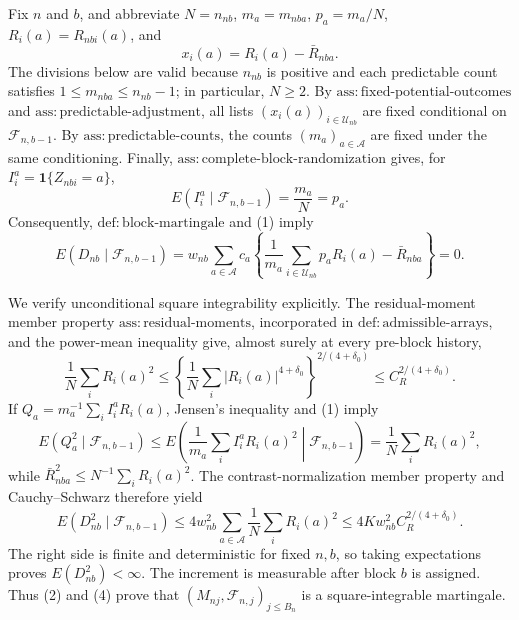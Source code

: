 Fix \(n\) and \(b\), and abbreviate \(N=n_{nb}\), \(m_a=m_{nba}\), \(p_a=m_a/N\), \(R_i(a)=R_{nbi}(a)\), and
\[
x_i(a)=R_i(a)-\bar R_{nba}.
\]
The divisions below are valid because \(n_{nb}\) is positive and each predictable count satisfies \(1\le m_{nba}\le n_{nb}-1\); in particular, \(N\ge2\). By \(\mathrm{ass:fixed\text{-}potential\text{-}outcomes}\) and \(\mathrm{ass:predictable\text{-}adjustment}\), all lists \((x_i(a))_{i\in\mathcal U_{nb}}\) are fixed conditional on \(\mathcal F_{n,b-1}\). By \(\mathrm{ass:predictable\text{-}counts}\), the counts \((m_a)_{a\in\mathcal A}\) are fixed under the same conditioning. Finally, \(\mathrm{ass:complete\text{-}block\text{-}randomization}\) gives, for \(I_i^a=\mathbf 1\{Z_{nbi}=a\}\),
\[
E(I_i^a\mid\mathcal F_{n,b-1})=\frac{m_a}{N}=p_a.
\tag{1}
\]
Consequently, \(\mathrm{def:block\text{-}martingale}\) and (1) imply
\[
E(D_{nb}\mid\mathcal F_{n,b-1})
=w_{nb}\sum_{a\in\mathcal A}c_a
\left\{\frac1{m_a}\sum_{i\in\mathcal U_{nb}}p_aR_i(a)-\bar R_{nba}\right\}=0.
\tag{2}
\]

We verify unconditional square integrability explicitly. The residual-moment member property \(\mathrm{ass:residual\text{-}moments}\), incorporated in \(\mathrm{def:admissible\text{-}arrays}\), and the power-mean inequality give, almost surely at every pre-block history,
\[
\frac1N\sum_iR_i(a)^2
\le \left\{\frac1N\sum_i|R_i(a)|^{4+\delta_0}\right\}^{2/(4+\delta_0)}
\le C_R^{2/(4+\delta_0)}.
\tag{3}
\]
If \(Q_a=m_a^{-1}\sum_iI_i^aR_i(a)\), Jensen's inequality and (1) imply
\[
E(Q_a^2\mid\mathcal F_{n,b-1})
\le E\left(\frac1{m_a}\sum_iI_i^aR_i(a)^2\middle|\mathcal F_{n,b-1}\right)
=\frac1N\sum_iR_i(a)^2,
\]
while \(\bar R_{nba}^2\le N^{-1}\sum_iR_i(a)^2\). The contrast-normalization member property and Cauchy--Schwarz therefore yield
\[
E(D_{nb}^2\mid\mathcal F_{n,b-1})
\le4w_{nb}^2\sum_{a\in\mathcal A}\frac1N\sum_iR_i(a)^2
\le4Kw_{nb}^2C_R^{2/(4+\delta_0)}.
\tag{4}
\]
The right side is finite and deterministic for fixed \(n,b\), so taking expectations proves \(E(D_{nb}^2)<\infty\). The increment is measurable after block \(b\) is assigned. Thus (2) and (4) prove that \((M_{nj},\mathcal F_{n,j})_{j\le B_n}\) is a square-integrable martingale.

